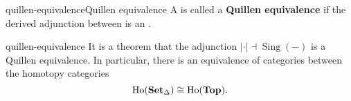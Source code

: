 \begin{topic}{quillen-equivalence}{Quillen equivalence}
    A  is called a \textbf{Quillen equivalence} if the derived adjunction between  is an .
\end{topic}

\begin{example}{quillen-equivalence}
    It is a theorem that the adjunction $| \cdot | \dashv \operatorname{Sing}(-)$ is a Quillen equivalence. In particular, there is an equivalence of categories between the homotopy categories
    \[ \textup{Ho}(\textbf{Set}_\Delta) \cong \textup{Ho}(\textbf{Top}) . \]
\end{example}

    

